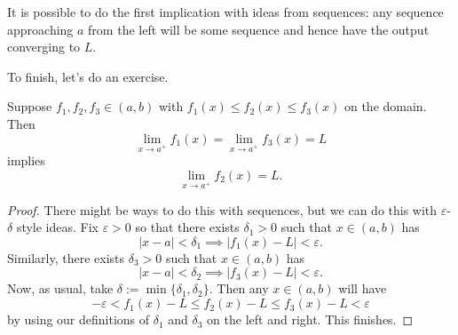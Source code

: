 \begin{remark}
	It is possible to do the first implication with ideas from sequences: any sequence approaching $a$ from the left will be some sequence and hence have the output converging to $L.$
\end{remark}
To finish, let's do an exercise.
\begin{exercise}
	Suppose $f_1,f_2,f_3\in(a,b)$ with $f_1(x)\le f_2(x)\le f_3(x)$ on the domain. Then
	\[\lim_{x\to a^+}f_1(x)=\lim_{x\to a^+}f_3(x)=L\]
	implies
	\[\lim_{x\to a^+}f_2(x)=L.\]
\end{exercise}
\begin{proof}
	There might be ways to do this with sequences, but we can do this with $\varepsilon$-$\delta$ style ideas. Fix $\varepsilon>0$ so that there exists $\delta_1>0$ such that $x\in(a,b)$ has
	\[|x-a|<\delta_1\implies|f_1(x)-L|<\varepsilon.\]
	Similarly, there exists $\delta_3>0$ such that $x\in(a,b)$ has
	\[|x-a|<\delta_2\implies|f_3(x)-L|<\varepsilon.\]
	Now, as usual, take $\delta:=\min\{\delta_1,\delta_2\}.$ Then any $x\in(a,b)$ will have
	\[-\varepsilon<f_1(x)-L\le f_2(x)-L\le f_3(x)-L<\varepsilon\]
	by using our definitions of $\delta_1$ and $\delta_3$ on the left and right. This finishes.
\end{proof}

